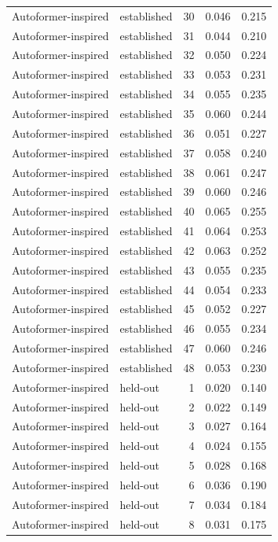 \begin{tabular}{llrrr}
Autoformer-inspired & established & 30 & 0.046 & 0.215 \\
Autoformer-inspired & established & 31 & 0.044 & 0.210 \\
Autoformer-inspired & established & 32 & 0.050 & 0.224 \\
Autoformer-inspired & established & 33 & 0.053 & 0.231 \\
Autoformer-inspired & established & 34 & 0.055 & 0.235 \\
Autoformer-inspired & established & 35 & 0.060 & 0.244 \\
Autoformer-inspired & established & 36 & 0.051 & 0.227 \\
Autoformer-inspired & established & 37 & 0.058 & 0.240 \\
Autoformer-inspired & established & 38 & 0.061 & 0.247 \\
Autoformer-inspired & established & 39 & 0.060 & 0.246 \\
Autoformer-inspired & established & 40 & 0.065 & 0.255 \\
Autoformer-inspired & established & 41 & 0.064 & 0.253 \\
Autoformer-inspired & established & 42 & 0.063 & 0.252 \\
Autoformer-inspired & established & 43 & 0.055 & 0.235 \\
Autoformer-inspired & established & 44 & 0.054 & 0.233 \\
Autoformer-inspired & established & 45 & 0.052 & 0.227 \\
Autoformer-inspired & established & 46 & 0.055 & 0.234 \\
Autoformer-inspired & established & 47 & 0.060 & 0.246 \\
Autoformer-inspired & established & 48 & 0.053 & 0.230 \\
Autoformer-inspired & held-out & 1 & 0.020 & 0.140 \\
Autoformer-inspired & held-out & 2 & 0.022 & 0.149 \\
Autoformer-inspired & held-out & 3 & 0.027 & 0.164 \\
Autoformer-inspired & held-out & 4 & 0.024 & 0.155 \\
Autoformer-inspired & held-out & 5 & 0.028 & 0.168 \\
Autoformer-inspired & held-out & 6 & 0.036 & 0.190 \\
Autoformer-inspired & held-out & 7 & 0.034 & 0.184 \\
Autoformer-inspired & held-out & 8 & 0.031 & 0.175 \\

\end{tabular}

